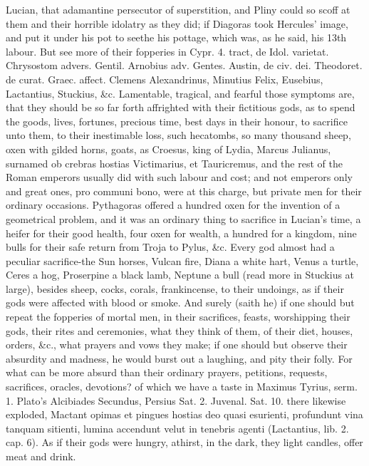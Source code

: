 {Lucian, that adamantine persecutor of superstition, and Pliny
could so scoff at them and their horrible idolatry as they did; if
Diagoras took Hercules' image, and put it under his pot to seethe his
pottage, which was, as he said, his 13th labour. But see more of their
fopperies in Cypr. 4. tract, de Idol. varietat. Chrysostom advers.
Gentil. Arnobius adv. Gentes. Austin, de civ. dei. Theodoret. de curat.
Graec. affect. Clemens Alexandrinus, Minutius Felix, Eusebius,
Lactantius, Stuckius, \&c. Lamentable, tragical, and fearful those
symptoms are, that they should be so far forth affrighted with their
fictitious gods, as to spend the goods, lives, fortunes, precious time,
best days in their honour, to sacrifice unto them, to their
inestimable loss, such hecatombs, so many thousand sheep, oxen with
gilded horns, goats, as Croesus, king of Lydia,  Marcus
Julianus, surnamed ob crebras hostias Victimarius, et Tauricremus, and
the rest of the Roman emperors usually did with such labour and cost;
and not emperors only and great ones, pro communi bono, were at this
charge, but private men for their ordinary occasions. Pythagoras
offered a hundred oxen for the invention of a geometrical problem, and
it was an ordinary thing to sacrifice in Lucian's time, a heifer
for their good health, four oxen for wealth, a hundred for a kingdom,
nine bulls for their safe return from Troja to Pylus, \&c. Every god
almost had a peculiar sacrifice-the Sun horses, Vulcan fire, Diana a
white hart, Venus a turtle, Ceres a hog, Proserpine a black lamb,
Neptune a bull (read more in  Stuckius at large), besides sheep,
cocks, corals, frankincense, to their undoings, as if their gods were
affected with blood or smoke. And surely (saith he) if one should
but repeat the fopperies of mortal men, in their sacrifices, feasts,
worshipping their gods, their rites and ceremonies, what they think of
them, of their diet, houses, orders, \&c., what prayers and vows they
make; if one should but observe their absurdity and madness, he would
burst out a laughing, and pity their folly. For what can be more absurd
than their ordinary prayers, petitions, requests, sacrifices,
oracles, devotions? of which we have a taste in Maximus Tyrius, serm.
1. Plato's Alcibiades Secundus, Persius Sat. 2. Juvenal. Sat. 10. there
likewise exploded, Mactant opimas et pingues hostias deo quasi
esurienti, profundunt vina tanquam sitienti, lumina accendunt velut in
tenebris agenti (Lactantius, lib. 2. cap. 6). As if their gods were
hungry, athirst, in the dark, they light candles, offer meat and drink.

}
